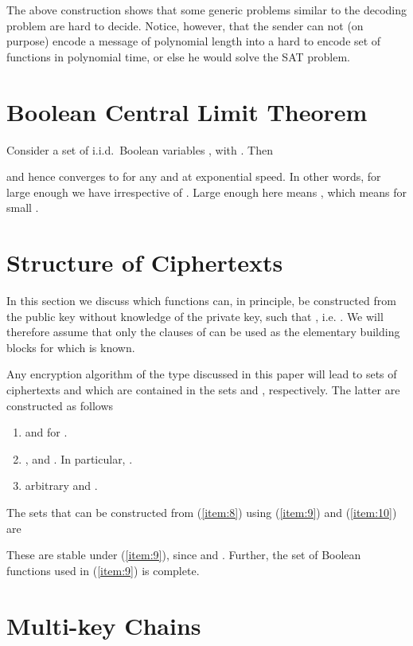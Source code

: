 \documentclass[final,journal,compsoc]{IEEEtran}
\begin{document}
The above construction shows that some generic problems similar to the
decoding problem are hard to decide. Notice, however, that the sender
can not (on purpose) encode a message of polynomial length into a hard
to encode set of functions in polynomial time, or else he would solve
the SAT problem.


\section{Boolean Central Limit Theorem\label{sec:boolean-clt}}

Consider a set of i.i.d.\ Boolean variables , with
. Then

and hence  converges to 
for any  and  at exponential speed. In other
words, for large enough  we have 
irrespective of . Large enough here means , which means  for small .




\section{Structure of Ciphertexts\label{sec:structure-ciphers}}

In this section we discuss which functions  can, in principle, be constructed from
the public key   without knowledge of the
private key, such that , i.e. . We
will therefore assume that only the clauses  of  can be used as the elementary building blocks
for which  is known.

Any encryption algorithm of the type discussed in this paper will lead
to sets of ciphertexts  and  which are contained in the sets
 and , respectively. The latter are constructed
as follows
\begin{enumerate}
\item\label{item:8}  and  for .
\item\label{item:9} ,  and . In
  particular, .
\item\label{item:10}  arbitrary  and .
\end{enumerate}

The sets that can be constructed from
(\ref{item:8}) using (\ref{item:9}) and (\ref{item:10}) are

These are stable under (\ref{item:9}),
since  and
. Further, the set of Boolean functions used in
(\ref{item:9}) is complete.



\section{Multi-key Chains\label{sec:multi-key}}
\end{document}
